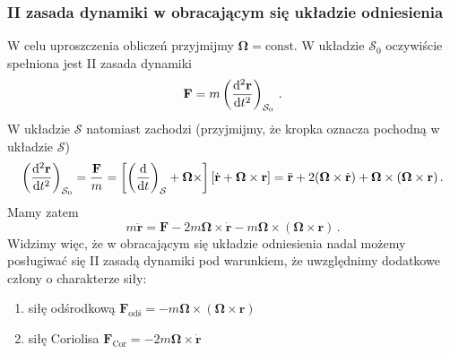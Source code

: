 \documentclass[../main.tex]{subfiles}
\begin{document}
\subsubsection{II zasada dynamiki w obracającym się układzie odniesienia}
W celu uproszczenia obliczeń przyjmijmy \(\boldsymbol{\Omega}=\text{const}\). W układzie \(\mathcal{S}_0\) oczywiście spełniona jest II zasada dynamiki
\begin{equation*}
    \mathbf{F}=m\left(\dv[2]{\mathbf{r}}{t}\right)_{\mathcal{S}_0}\,.
\end{equation*}
W układzie \(\mathcal{S}\) natomiast zachodzi (przyjmijmy, że kropka oznacza pochodną w układzie \(\mathcal{S}\))
\begin{equation*}
    \left(\dv[2]{\mathbf{r}}{t}\right)_{\mathcal{S}_0}=\frac{\mathbf{F}}{m}=\left[\left(\dv{}{t}\right)_\mathcal{S}+\boldsymbol{\Omega}\times\right]\left[\dot{\mathbf{r}}+\boldsymbol{\Omega}\times\mathbf{r}\right]=\ddot{\mathbf{r}}+2(\boldsymbol{\Omega}\times\dot{\mathbf{r}})+\boldsymbol{\Omega}\times(\boldsymbol{\Omega}\times\mathbf{r})\,.
\end{equation*}
Mamy zatem
\begin{equation*}
    m\ddot{\mathbf{r}}=\mathbf{F}-2m\boldsymbol{\Omega}\times\dot{\mathbf{r}}-m\boldsymbol{\Omega}\times(\boldsymbol{\Omega}\times\mathbf{r})\,.
\end{equation*}
Widzimy więc, że w obracającym się układzie odniesienia nadal możemy posługiwać się II zasadą dynamiki pod warunkiem, że uwzględnimy dodatkowe człony o charakterze siły:
\begin{enumerate}
    \item siłę odśrodkową \(\mathbf{F}_\text{odś}=-m\boldsymbol{\Omega}\times(\boldsymbol{\Omega}\times\mathbf{r})\)
    \item siłę Coriolisa \(\mathbf{F}_\text{Cor}=-2m\boldsymbol{\Omega}\times\dot{\mathbf{r}}\)
\end{enumerate}
\end{document}
